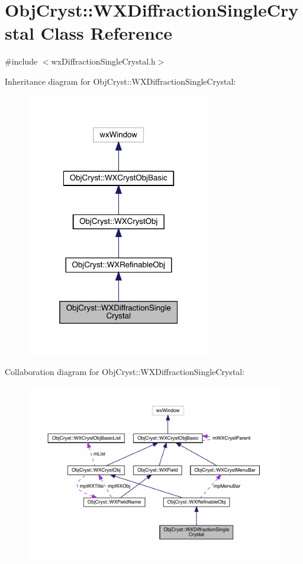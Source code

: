 \hypertarget{class_obj_cryst_1_1_w_x_diffraction_single_crystal}{}\section{Obj\+Cryst\+::W\+X\+Diffraction\+Single\+Crystal Class Reference}
\label{class_obj_cryst_1_1_w_x_diffraction_single_crystal}


{\ttfamily \#include $<$wx\+Diffraction\+Single\+Crystal.\+h$>$}



Inheritance diagram for Obj\+Cryst\+::W\+X\+Diffraction\+Single\+Crystal\+:
\nopagebreak
\begin{figure}[H]
\begin{center}
\leavevmode
\includegraphics[width=229pt]{class_obj_cryst_1_1_w_x_diffraction_single_crystal__inherit__graph}
\end{center}
\end{figure}


Collaboration diagram for Obj\+Cryst\+::W\+X\+Diffraction\+Single\+Crystal\+:
\nopagebreak
\begin{figure}[H]
\begin{center}
\leavevmode
\includegraphics[width=350pt]{class_obj_cryst_1_1_w_x_diffraction_single_crystal__coll__graph}
\end{center}
\end{figure}
